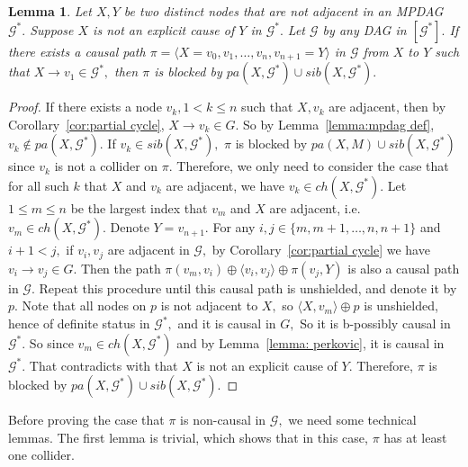 \documentclass{article}
\newtheorem{lemma}{Lemma}
\begin{document}
\begin{lemma}
\label{lemma:explicit only if causal}
Let $X,Y$ be two distinct nodes that are not adjacent in an MPDAG $\mathcal{G}^*.$ Suppose $X$ is not an explicit cause of $Y$ in $\mathcal{G}^*.$ Let $\mathcal{G}$ by any DAG in $[\mathcal{G}^*].$ If there exists a causal path $\pi=\langle X=v_0,v_1,\dots,v_n,v_{n+1}=Y\rangle$ in $\mathcal{G}$ from $X$ to $Y$ such that $X\to v_1\in \mathcal{G}^*,$ then $\pi$ is blocked by $pa(X,\mathcal{G}^*)\cup sib(X,\mathcal{G}^*).$ 
\end{lemma}
\begin{proof}
If there exists a node $v_k, 1<k\le n$ such that $X,v_k$ are adjacent, then by Corollary~\ref{cor:partial cycle}, $X\to v_k\in G.$ So by Lemma~\ref{lemma:mpdag def}, $v_k\not\in pa(X,\mathcal{G}^*)$. If $v_k\in sib(X,\mathcal{G}^*),$ $\pi$ is blocked by $pa(X,M)\cup sib(X,\mathcal{G}^*)$ since $v_k$ is not a collider on $\pi.$ Therefore, we only need to consider the case that for all such $k$ that $X$ and $v_k$ are adjacent, we have $v_k\in ch(X,\mathcal{G}^*).$ Let $1\le m\le n$ be the largest index that $v_m$ and $X$ are adjacent, i.e. $v_m\in ch(X,\mathcal{G}^*).$ Denote $Y=v_{n+1}.$ For any $i,j\in \{m,m+1,\dots,n,n+1\}$ and $i+1<j,$ if $v_i,v_j$ are adjacent in $\mathcal{G},$ by Corollary~\ref{cor:partial cycle} we have $v_i\to v_j\in G$. Then the path $\pi(v_m,v_i)\oplus \langle v_i,v_j\rangle \oplus \pi(v_j,Y)$ is also a causal path in $\mathcal{G}.$ Repeat this procedure until this causal path is unshielded, and denote it by $p.$ Note that all nodes on $p$ is not adjacent to $X,$ so $\langle X,v_m\rangle \oplus p$ is unshielded, hence of definite status in $\mathcal{G}^*,$ and it is causal in $G,$ So it is b-possibly causal in $\mathcal{G}^*.$ So since $v_m\in ch(X,\mathcal{G}^*)$ and by Lemma~\ref{lemma: perkovic}, it is causal in $\mathcal{G}^*.$ That contradicts with that $X$ is not an explicit cause of $Y.$ Therefore, $\pi$ is blocked by $pa(X,\mathcal{G}^*)\cup sib(X,\mathcal{G}^*).$
\end{proof}

Before proving the case that $\pi$ is non-causal in $\mathcal{G},$ we need some technical lemmas. The first lemma is trivial, which shows that in this case, $\pi$ has at least one collider.
\end{document}
